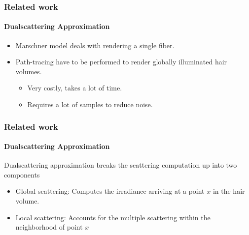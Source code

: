 \documentclass{beamer}
\begin{document}
  \begin{frame}
    \frametitle{Related work}
    \framesubtitle{Dualscattering Approximation}

\begin{itemize}
\item Marschner model deals with rendering a single fiber.
	
\item Path-tracing have to be performed to render globally illuminated hair volumes.

\begin{itemize}
\item Very costly, takes a lot of time.
\item Requires a lot of samples to reduce noise.
\end{itemize}
\end{itemize}
  \end{frame}  
  
  \begin{frame}
    \frametitle{Related work}
    \framesubtitle{Dualscattering Approximation}
    Dualscattering approximation breaks the scattering computation up into two components
    \begin{itemize}
    \item Global scattering: Computes the irradiance arriving at a point $x$ in the hair volume.
        \item Local scattering: Accounts for the multiple scattering within the neighborhood of point $x$
    \end{itemize}
  \end{frame}
  
\end{document}
